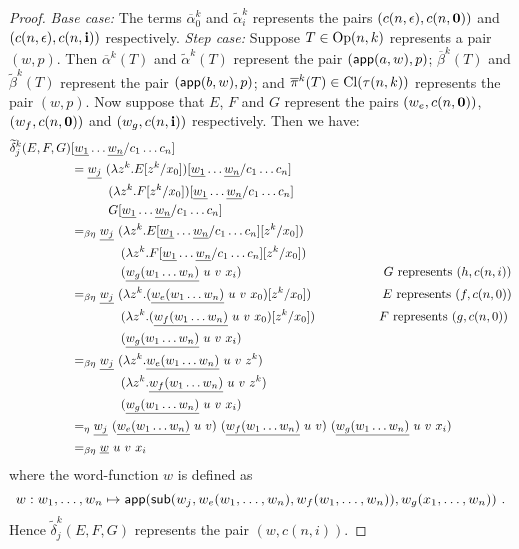 \begin{proof}
\emph{Base case:} The terms $\overline\alpha_0^k$ and
$\widetilde\alpha_i^k$ represents the pairs
$(c(n,\epsilon),c(n,\mathbf{0}))$ and
$(c(n,\epsilon),c(n,\mathbf{i}))$ respectively. \emph{Step case:}
Suppose $T\in {\rm Op}(n,k)$ represents
 a pair $(w,p)$.  Then $\overline\alpha^k(T)$ and
 $\widetilde\alpha^k(T)$ represent the pair
 $({\sf app}(a,w),p)$; $\overline\beta^k(T)$ and
 $\widetilde\beta^k(T)$ represent the pair
 $({\sf app}(b,w),p)$; and $\overline\pi^k(T) \in {\rm Cl}(\tau(n,k))$ represents the pair $(w,p)$. Now suppose that $E$, $F$ and $G$ represent the pairs
 $(w_e,c(n,\mathbf{0}))$, $(w_f,c(n,\mathbf{0}))$ and $(w_g,c(n,\mathbf{i}))$ respectively.
 Then we have:
 \begin{align*}
   \widetilde \delta^k_j (E,F,G) &[\zaioncencode{w_1}\ldots \zaioncencode{w_n}/c_1\ldots c_n] \\
   &= \zaioncencode{w_j}\  (\lambda z^k. E[z^k/x_0])[\zaioncencode{w_1}\ldots \zaioncencode{w_n}/c_1\ldots c_n] \\
       & \qquad\quad (\lambda z^k. F[z^k/x_0])[\zaioncencode{w_1}\ldots \zaioncencode{w_n}/c_1\ldots c_n] \\
       & \qquad\quad  G[\zaioncencode{w_1}\ldots \zaioncencode{w_n}/c_1\ldots c_n] \\
   &=_{\beta\eta} \zaioncencode{w_j}\  (\lambda z^k. E[\zaioncencode{w_1}\ldots \zaioncencode{w_n}/c_1\ldots c_n][z^k/x_0]) \\
       & \qquad\qquad (\lambda z^k. F[\zaioncencode{w_1}\ldots \zaioncencode{w_n}/c_1\ldots c_n][z^k/x_0]) \\
       & \qquad\qquad  (\zaioncencode{w_g(w_1\ldots w_n)}~u~v~x_i) \hspace{4cm}\mbox{$G$ represents $(h,c(n,i))$}\\
   &=_{\beta\eta} \zaioncencode{w_j}\  (\lambda z^k. (\zaioncencode{w_e(w_1\ldots w_n)}~u~v~x_0)[z^k/x_0]) \hspace{2cm}\mbox{$E$ represents $(f,c(n,0))$} \\
       & \qquad\qquad (\lambda z^k. (\zaioncencode{w_f(w_1\ldots w_n)}~u~v~x_0)[z^k/x_0]) \hspace{1.8cm}\mbox{$F$ represents $(g,c(n,0))$} \\
       & \qquad\qquad  (\zaioncencode{w_g(w_1\ldots w_n)}~u~v~x_i)\\
%
   &=_{\beta\eta} \zaioncencode{w_j}\  (\lambda z^k. \zaioncencode{w_e(w_1\ldots w_n)}~u~v~z^k) \\
       & \qquad\qquad (\lambda z^k. \zaioncencode{w_f(w_1\ldots w_n)}~u~v~z^k) \\
       & \qquad\qquad (\zaioncencode{w_g(w_1\ldots w_n)}~u~v~x_i)\\
%
   &=_\eta \zaioncencode{w_j}\  (\zaioncencode{w_e(w_1\ldots w_n)}~u~v)  \ (\zaioncencode{w_f(w_1\ldots w_n)}~u~v) \  (\zaioncencode{w_g(w_1\ldots w_n)}~u~v~x_i)\\
%
   &=_{\beta\eta}  \zaioncencode{w}~u~v~ x_i
 \end{align*}
where the word-function $w$ is defined as
$$w: w_1,\ldots,w_n \mapsto {\sf app}({\sf sub}(w_j,w_e(w_1,\ldots,w_n),w_f(w_1,\ldots,w_n)),w_g(x_1,\ldots,w_n)) \ .$$
  Hence $\widetilde \delta^k_j (E,F,G)$ represents the pair $(w,c(n,i))$.


\end{proof}
